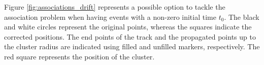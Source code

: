 Figure \ref{fig:associations_drift} represents a possible option to tackle the association problem when having events with a non-zero initial time $t_{0}$. The black and white circles represent the original points, whereas the squares indicate the corrected positions. The end points of the track and the propagated points up to the cluster radius are indicated using filled and unfilled markers, respectively. The red square represents the position of the cluster.

